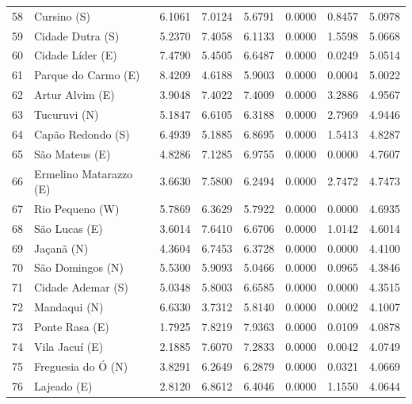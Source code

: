 \documentclass[12pt]{article}
\begin{document}
\begin{longtable}[c]{c|lccccc|c}
58  & Cursino            (S) & 6.1061   & 7.0124   & 5.6791   & 0.0000   & 0.8457   & 5.0978  \\
59  & Cidade Dutra       (S) & 5.2370   & 7.4058   & 6.1133   & 0.0000   & 1.5598   & 5.0668  \\
60  & Cidade Líder       (E) & 7.4790   & 5.4505   & 6.6487   & 0.0000   & 0.0249   & 5.0514  \\
61  & Parque do Carmo    (E) & 8.4209   & 4.6188   & 5.9003   & 0.0000   & 0.0004   & 5.0022  \\
62  & Artur Alvim        (E) & 3.9048   & 7.4022   & 7.4009   & 0.0000   & 3.2886   & 4.9567  \\
63  & Tucuruvi           (N) & 5.1847   & 6.6105   & 6.3188   & 0.0000   & 2.7969   & 4.9446  \\
64  & Capão Redondo      (S) & 6.4939   & 5.1885   & 6.8695   & 0.0000   & 1.5413   & 4.8287  \\
65  & São Mateus         (E) & 4.8286   & 7.1285   & 6.9755   & 0.0000   & 0.0000   & 4.7607  \\
66  & Ermelino Matarazzo (E) & 3.6630   & 7.5800   & 6.2494   & 0.0000   & 2.7472   & 4.7473  \\
67  & Rio Pequeno        (W) & 5.7869   & 6.3629   & 5.7922   & 0.0000   & 0.0000   & 4.6935  \\
68  & São Lucas          (E) & 3.6014   & 7.6410   & 6.6706   & 0.0000   & 1.0142   & 4.6014  \\
69  & Jaçanã             (N) & 4.3604   & 6.7453   & 6.3728   & 0.0000   & 0.0000   & 4.4100  \\
70  & São Domingos       (N) & 5.5300   & 5.9093   & 5.0466   & 0.0000   & 0.0965   & 4.3846  \\
71  & Cidade Ademar      (S) & 5.0348   & 5.8003   & 6.6585   & 0.0000   & 0.0000   & 4.3515  \\
72  & Mandaqui           (N) & 6.6330   & 3.7312   & 5.8140   & 0.0000   & 0.0002   & 4.1007  \\
73  & Ponte Rasa         (E) & 1.7925   & 7.8219   & 7.9363   & 0.0000   & 0.0109   & 4.0878  \\
74  & Vila Jacuí         (E) & 2.1885   & 7.6070   & 7.2833   & 0.0000   & 0.0042   & 4.0749  \\
75  & Freguesia do Ó     (N) & 3.8291   & 6.2649   & 6.2879   & 0.0000   & 0.0321   & 4.0669  \\
76  & Lajeado            (E) & 2.8120   & 6.8612   & 6.4046   & 0.0000   & 1.1550   & 4.0644  \\

\end{longtable}
\end{document}
